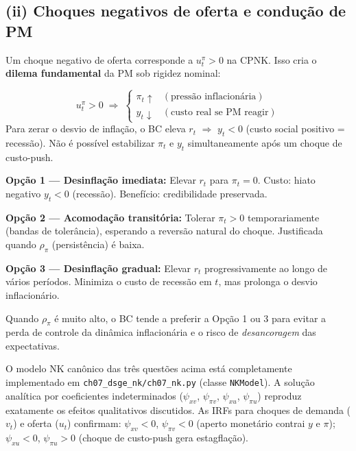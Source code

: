 \documentclass[12pt, a4paper]{article}
\begin{document}
\subsection*{(ii) Choques negativos de oferta e condução de PM}

Um choque negativo de oferta corresponde a $u_t^\pi > 0$ na CPNK. Isso cria o
\textbf{dilema fundamental} da PM sob rigidez nominal:

\begin{resultbox}[title={Trade-off estagflacionário}]
\[
u_t^\pi > 0 \;\Rightarrow\; \begin{cases}
\pi_t \uparrow & (\text{pressão inflacionária}) \\
y_t \downarrow & (\text{custo real se PM reagir})
\end{cases}
\]
Para zerar o desvio de inflação, o BC eleva $r_t$ $\Rightarrow$ $y_t < 0$
(custo social positivo = recessão). Não é possível estabilizar $\pi_t$ e $y_t$
simultaneamente após um choque de custo-push.
\end{resultbox}

\begin{provabox}[title={Estratégias do BC diante de choques de oferta}]
\textbf{Opção 1 --- Desinflação imediata:} Elevar $r_t$ para $\pi_t = 0$.
Custo: hiato negativo $y_t < 0$ (recessão). Benefício: credibilidade preservada.

\textbf{Opção 2 --- Acomodação transitória:} Tolerar $\pi_t > 0$ temporariamente
(bandas de tolerância), esperando a reversão natural do choque. Justificada quando
$\rho_\pi$ (persistência) é baixa.

\textbf{Opção 3 --- Desinflação gradual:} Elevar $r_t$ progressivamente ao longo
de vários períodos. Minimiza o custo de recessão em $t$, mas prolonga o desvio
inflacionário.

Quando $\rho_\pi$ é muito alto, o BC tende a preferir a Opção 1 ou 3 para evitar
a perda de controle da dinâmica inflacionária e o risco de \emph{desancoragem}
das expectativas.
\end{provabox}

\vspace{1em}
\begin{formulabox}[title={Conexão com o modelo computacional (ch07\_nk.py)}]
O modelo NK canônico das três questões acima está completamente implementado em
\texttt{ch07\_dsge\_nk/ch07\_nk.py} (classe \texttt{NKModel}).
A solução analítica por coeficientes indeterminados ($\psi_{xv}$, $\psi_{\pi v}$,
$\psi_{xu}$, $\psi_{\pi u}$) reproduz exatamente os efeitos qualitativos discutidos.
As IRFs para choques de demanda ($v_t$) e oferta ($u_t$) confirmam:
$\psi_{xv} < 0$, $\psi_{\pi v} < 0$ (aperto monetário contrai $y$ e $\pi$);
$\psi_{xu} < 0$, $\psi_{\pi u} > 0$ (choque de custo-push gera estagflação).
\end{formulabox}
\end{document}
